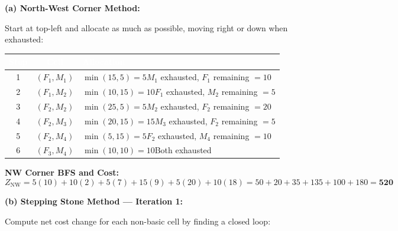 \documentclass[12pt]{article}
\begin{document}
\begin{ansbox}
\textbf{(a) North-West Corner Method:}

Start at top-left and allocate as much as possible, moving right or down when exhausted:

\begin{center}
\begin{tabular}{|c|c|l|}
\hline
\rowcolor{primary!80}\textcolor{white}{\textbf{Step}}&\textcolor{white}{\textbf{Cell}}&\textcolor{white}{\textbf{Allocation}}\\
\hline
1 & $(F_1,M_1)$ & $\min(15,5)=5$\quad $M_1$ exhausted, $F_1$ remaining $=10$\\\hline
2 & $(F_1,M_2)$ & $\min(10,15)=10$\quad $F_1$ exhausted, $M_2$ remaining $=5$\\\hline
3 & $(F_2,M_2)$ & $\min(25,5)=5$\quad $M_2$ exhausted, $F_2$ remaining $=20$\\\hline
4 & $(F_2,M_3)$ & $\min(20,15)=15$\quad $M_3$ exhausted, $F_2$ remaining $=5$\\\hline
5 & $(F_2,M_4)$ & $\min(5,15)=5$\quad $F_2$ exhausted, $M_4$ remaining $=10$\\\hline
6 & $(F_3,M_4)$ & $\min(10,10)=10$\quad Both exhausted\\\hline
\end{tabular}
\end{center}

\textbf{NW Corner BFS and Cost:}
\[
  Z_{\text{NW}} = 5(10)+10(2)+5(7)+15(9)+5(20)+10(18) = 50+20+35+135+100+180 = \mathbf{520}
\]

\medskip
\textbf{(b) Stepping Stone Method — Iteration 1:}

Compute net cost change for each non-basic cell by finding a closed loop:

\begin{center}
\end{center}


\end{ansbox}
\end{document}
